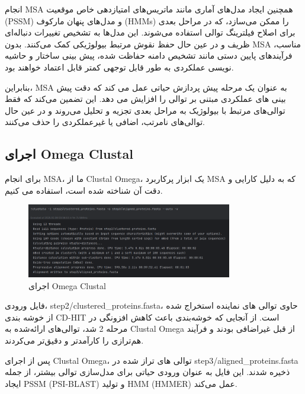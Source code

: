                 انجام 
                MSA 
                همچنین ایجاد مدل‌های آماری مانند ماتریس‌های امتیازدهی خاص موقعیت 
                (PSSM) 
                و مدل‌های پنهان مارکوف 
                (HMMs) 
                را ممکن می‌سازد، که در مراحل بعدی برای اصلاح فیلترینگ توالی استفاده می‌شوند. این مدل‌ها به تشخیص تغییرات دنباله‌ای ظریف و در عین حال حفظ نقوش مرتبط بیولوژیکی کمک می‌کنند. بدون 
                MSA 
                مناسب، فرآیندهای پایین دستی مانند تشخیص دامنه حفاظت شده، پیش بینی ساختار و حاشیه نویسی عملکردی به طور قابل توجهی کمتر قابل اعتماد خواهند بود.
                
                بنابراین، 
                MSA 
                به عنوان یک مرحله پیش پردازش حیاتی عمل می کند که دقت پیش بینی های عملکردی مبتنی بر توالی را افزایش می دهد. این تضمین می‌کند که فقط توالی‌های مرتبط با بیولوژیک به مراحل بعدی تجزیه و تحلیل می‌روند و در عین حال توالی‌های نامرتب، اضافی یا غیرعملکردی را حذف می‌کنند.
            \subsection*{اجرای Omega Clustal}
                برای انجام MSA، ما از Clustal Omega، یک ابزار پرکاربرد MSA که به دلیل کارایی و دقت آن شناخته شده است، استفاده می کنیم.
                \begin{figure}[H]
                    \centering
                    \includegraphics[width=0.8\textwidth]{images/run_omega_clustal.png} %
                    \caption{اجرای Omega Clustal}
                    \label{fig:run_omega_clustal}
                \end{figure}
                فایل ورودی، step2/clustered\_proteins.fasta، حاوی توالی های نماینده استخراج شده از خوشه بندی CD-HIT است. از آنجایی که خوشه‌بندی باعث کاهش افزونگی در مرحله 2 شد، توالی‌های ارائه‌شده به Clustal Omega از قبل غیراضافی بودند و فرآیند هم‌ترازی را کارآمدتر و دقیق‌تر می‌کردند.

                پس از اجرای Clustal Omega، توالی های تراز شده در step3/aligned\_proteins.fasta ذخیره شدند. این فایل به عنوان ورودی حیاتی برای مدل‌سازی توالی بیشتر، از جمله ایجاد PSSM (PSI-BLAST) و تولید HMM (HMMER) عمل می‌کند.

